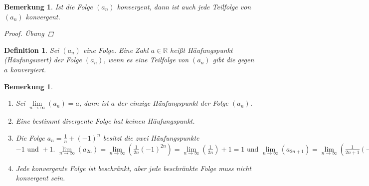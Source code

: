\documentclass[a4paper,titlepage,oneside]{article}
\def\R{\ensuremath{\mathbb{R}} }
\renewcommand{\liminf}[2]{\ensuremath{\lim\limits_{#1 \rightarrow \infty}{\left(#2\right)}}}
\theoremstyle{thmstyle}
\newtheorem{defi}[satz]{Definition}
\newtheorem{bem}[satz]{Bemerkung}
\begin{document}
\begin{bem}
Ist die Folge \((a_n)\) konvergent, dann ist auch jede Teilfolge von \((a_n)\) konvergent.
\begin{proof} Übung \end{proof}
\end{bem}

\begin{defi}
Sei \((a_n)\) eine Folge. Eine Zahl \(a \in \R\) heißt Häufungspunkt (Häufungswert) der Folge \((a_n)\), wenn es eine Teilfolge von \((a_n)\) gibt die gegen \(a\) konvergiert.
\end{defi}

\begin{bem}
\begin{enumerate}
\item Sei \(\liminf{n}{a_n} = a\), dann ist \(a\) der einzige Häufungspunkt der Folge \((a_n)\).
\item Eine bestimmt divergente Folge hat keinen Häufungspunkt.
\item Die Folge \(a_n = \frac{1}{n}+ (-1)^n\) besitzt die zwei Häufungspunkte \(-1\text{ und }+1\text{. }\liminf{n}{a_{2n}} = \liminf{n}{\frac{1}{2n} (-1)^{2n}} = \liminf{n}{\frac{1}{2n}} + 1 = 1 \text{ und } \liminf{n}{a_{2n+1}} = \liminf{n}{\frac{1}{2n+1} (-1)^{2n+1}} = \liminf{n}{\frac{1}{2n+1}} - 1 = - 1\)
\item Jede konvergente Folge ist beschränkt, aber jede beschränkte Folge muss nicht konvergent sein.
\end{enumerate}
\end{bem}
\end{document}
